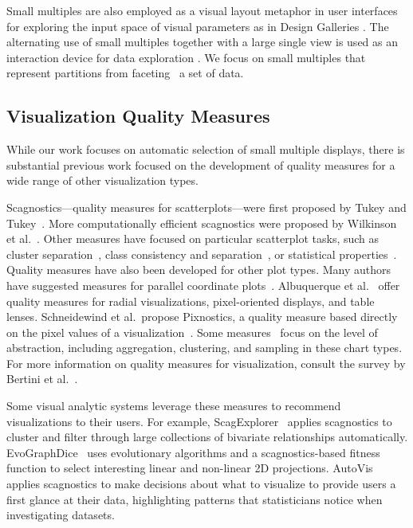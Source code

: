 
Small multiples are also employed as a visual layout metaphor in user interfaces for exploring the input space of visual parameters as in Design Galleries \cite{marks1997}. The alternating use of small multiples together with a large single view is used as an interaction device for data exploration \cite{van2013}. We focus on small multiples that represent partitions from faceting~\cite{Wilkinson2005GG} a set of data.

\subsection{Visualization Quality Measures}
While our work focuses on automatic selection of small multiple displays, there is substantial previous work focused on the development of quality measures for a wide range of other visualization types. 

Scagnostics---quality measures for scatterplots---were first proposed by Tukey and Tukey~\cite{Tukey1982, Tukey1985}. More computationally efficient scagnostics were proposed by Wilkinson et al.~\cite{Wilkinson2005, Wilkinson2008}. Other measures have focused on particular scatterplot tasks, such as cluster separation~\cite{Sedlmair2012, Tatu2009}, class consistency and separation~\cite{Sips2009, Schafer2013}, or statistical properties~\cite{Kandel2012, Seo2005, Piringer2008}.
Quality measures have also been developed for other plot types. Many authors have suggested measures for parallel coordinate plots~\cite{Ankerst1998, Dasgupta2010, Johansson2009, Yang2003}. Albuquerque et al.~\cite{Albuquerque2010} offer quality measures for radial visualizations, pixel-oriented displays, and table lenses. Schneidewind et al.\ propose Pixnostics, a quality measure based directly on the pixel values of a visualization~\cite{Schneidewind2006}. Some measures~\cite{Bertini2006, Cui2006, Yang2003} focus on the level of abstraction, including aggregation, clustering, and sampling in these chart types. For more information on quality measures for visualization, consult the survey by Bertini et al.~\cite{Bertini2011}. 

Some visual analytic systems leverage these measures to recommend visualizations to their users. For example, ScagExplorer~\cite{Dang2014} applies scagnostics to cluster and filter through large collections of bivariate relationships automatically.
EvoGraphDice~\cite{Boukhelifa2013} uses evolutionary algorithms and a scagnostics-based fitness function to select interesting linear and non-linear 2D projections.
AutoVis~\cite{Wills2010} applies scagnostics to make decisions about what to visualize to provide users a first glance at their data, highlighting patterns that statisticians notice when investigating datasets.

